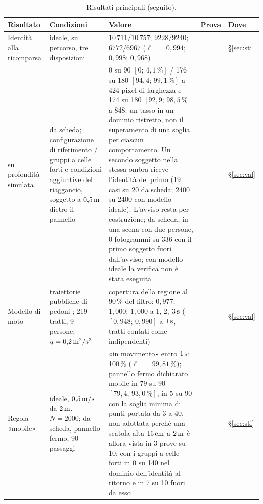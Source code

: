 \begin{table}[p]
\begin{tabularx}{\textwidth}{@{}>{\RaggedRight\arraybackslash}p{2.8cm}>{\RaggedRight\arraybackslash}p{4.1cm}L>{\RaggedRight\arraybackslash}p{1.2cm}>{\RaggedRight\arraybackslash}p{1.05cm}@{}}
\bottomrule
\end{tabularx}
\end{table}

\begin{table}[p]
\centering\footnotesize
\setlength{\tabcolsep}{4pt}\renewcommand{\arraystretch}{0.92}
\caption{Risultati principali (seguito).}\label{tab:intro-sintesi-due}
\begin{tabularx}{\textwidth}{@{}>{\RaggedRight\arraybackslash}p{2.8cm}>{\RaggedRight\arraybackslash}p{4.1cm}L>{\RaggedRight\arraybackslash}p{1.2cm}>{\RaggedRight\arraybackslash}p{1.05cm}@{}}
\toprule
Risultato & Condizioni & Valore & Prova & Dove\\
\midrule
Identità alla ricomparsa & ideale, sul percorso, tre disposizioni & $10\,711/10\,757$; $9228/9240$; $6772/6967$ ($\ell^-=0{,}994$; $0{,}998$; $0{,}968$) &  & \S\ref{sec:sti}\\
\quad su profondità simulata & da scheda; configurazione di riferimento / gruppi a celle forti e condizioni aggiuntive del riaggancio, soggetto a $0{,}5\,\mathrm{m}$ dietro il pannello & 0 su 90 $[0;\,4{,}1\,\%]$ / 176 su 180 $[94{,}4;\,99{,}1\,\%]$ a 424 pixel di larghezza e 174 su 180 $[92{,}9;\,98{,}5\,\%]$ a 848: un tasso in un dominio ristretto, non il superamento di una soglia per ciascun comportamento. Un secondo soggetto nella stessa ombra riceve l'identità del primo (19 casi su 20 da scheda; 2400 su 2400 con modello ideale). L'avviso resta per costruzione; da scheda, in una scena con due persone, 0 fotogrammi su 336 con il primo soggetto fuori dall'avviso; con modello ideale la verifica non è stata eseguita &  & \S\ref{sec:val}\\
Modello di moto & traiettorie pubbliche di pedoni \cite{thor}; 219 tratti, 9 persone; $q=0{,}2\,\mathrm{m^2/s^3}$ & copertura della regione al 90\,\% del filtro: $0{,}977$; $1{,}000$; $1{,}000$ a 1, 2, $3\,\mathrm{s}$ ($[0{,}948;\,0{,}990]$ a $1\,\mathrm{s}$, tratti contati come indipendenti) &  & \S\ref{sec:val}\\
Regola «mobile» & ideale, $0{,}5\,\mathrm{m/s}$ da $2\,\mathrm{m}$, $N=2000$; da scheda, pannello fermo, 90 passaggi & «in movimento» entro $1\,\mathrm{s}$: 100\,\% ($\ell^-=99{,}81\,\%$); pannello fermo dichiarato mobile in 79 su 90 $[79{,}4;\,93{,}0\,\%]$; in 5 su 90 con la soglia minima di punti portata da 3 a 40, non adottata perché una scatola alta $15\,\mathrm{cm}$ a $2\,\mathrm{m}$ è allora vista in 3 prove su 10; con i gruppi a celle forti in 0 su 140 nel dominio dell'identità al ritorno e in 7 su 10 fuori da esso &  & \S\ref{sec:sti}\\

\end{tabularx}
\end{table}
